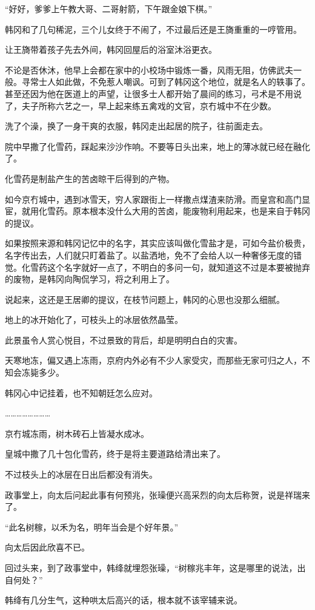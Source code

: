 “好好，爹爹上午教大哥、二哥射箭，下午跟金娘下棋。”

韩冈和了几句稀泥，三个儿女终于不闹了，不过最后还是王旖重重的一哼管用。

让王旖带着孩子先去外间，韩冈回屋后的浴室沐浴更衣。

不论是否休沐，他早上会都在家中的小校场中锻炼一番，风雨无阻，仿佛武夫一般。寻常士人如此做，不免惹人嘲讽。可到了韩冈这个地位，就是名人的轶事了。甚至还因为他在医道上的声望，让很多士人都开始了晨间的练习，弓术是不用说了，夫子所称六艺之一，早上起来练五禽戏的文官，京冇城中不在少数。

洗了个澡，换了一身干爽的衣服，韩冈走出起居的院子，往前面走去。

院中早撒了化雪药，踩起来沙沙作响。不要等日头出来，地上的薄冰就已经在融化了。

化雪药是制盐产生的苦卤晾干后得到的产物。

如今京冇城中，遇到冰雪天，穷人家跟街上一样撒点煤渣来防滑。而皇宫和高门显宦，就用化雪药。原本根本没什么大用的苦卤，能废物利用起来，也是来自于韩冈的提议。

如果按照来源和韩冈记忆中的名字，其实应该叫做化雪盐才是，可如今盐价极贵，名字传出去，人们就只盯着盐了。以盐洒地，免不了会给人以一种奢侈无度的错觉。化雪药这个名字就好一点了，不明白的多问一句，就知道这不过是本要被抛弃的废物，是韩冈向陶侃学习，将之利用上了。

说起来，这还是王居卿的提议，在枝节问题上，韩冈的心思也没那么细腻。

地上的冰开始化了，可枝头上的冰层依然晶莹。

此景虽令人赏心悦目，不过景致的背后，却是明明白白的灾害。

天寒地冻，偏又遇上冻雨，京府内外必有不少人家受灾，而那些无家可归之人，不知会冻毙多少。

韩冈心中记挂着，也不知朝廷怎么应对。

……………………

京冇城冻雨，树木砖石上皆凝水成冰。

皇城中撒了几十包化雪药，终于是将主要道路给清出来了。

不过枝头上的冰层在日出后都没有消失。

政事堂上，向太后问起此事有何预兆，张璪便兴高采烈的向太后称贺，说是祥瑞来了。

“此名树稼，以禾为名，明年当会是个好年景。”

向太后因此欣喜不已。

回过头来，到了政事堂中，韩绛就埋怨张璪，“树稼兆丰年，这是哪里的说法，出自何处？”

韩绛有几分生气，这种哄太后高兴的话，根本就不该宰辅来说。

